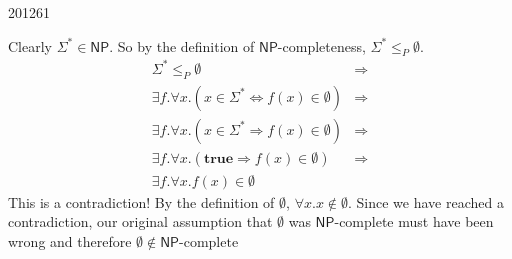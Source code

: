 \documentclass[10pt,\jkfside,a4paper]{article}
\newcommand{\NP}{\ensuremath{\mathsf{NP}}}
\begin{document}
\begin{examquestion}{2012}{6}{1}
\begin{enumerate}[label=(\alph*)]
Clearly $\Sigma^* \in \NP$. So by the definition of $\NP$-completeness,
$\Sigma^*\le_P \emptyset$.
\begin{align*}
\Sigma^* \le_P \emptyset &\Longrightarrow \\
\exists f. \forall x. (x \in \Sigma^* \Longleftrightarrow f(x) \in \emptyset)
&\Longrightarrow \\
\exists f. \forall x. (x \in \Sigma^* \Longrightarrow f(x) \in \emptyset)
&\Longrightarrow \\
\exists f. \forall x. (\mathbf{true} \Longrightarrow f(x) \in \emptyset)
&\Longrightarrow \\
\exists f. \forall x. f(x) \in \emptyset &
\end{align*}
This is a contradiction! By the definition of $\emptyset$, $\forall x. x
\notin \emptyset$. Since we have reached a contradiction, our original
assumption that $\emptyset$ was \NP-complete must have been wrong and
therefore $\emptyset \notin \NP\text{-complete}$

\end{enumerate}

\end{examquestion}
\end{document}
